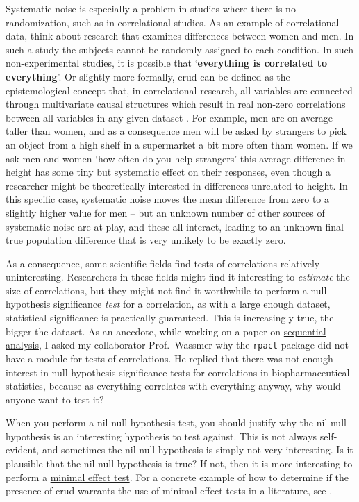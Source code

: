 \documentclass[
  oneside]{krantz}
\begin{document}
Systematic noise is especially a problem in studies where there is no randomization, such as in correlational studies. As an example of correlational data, think about research that examines differences between women and men. In such a study the subjects cannot be randomly assigned to each condition. In such non-experimental studies, it is possible that `\textbf{everything is correlated to everything}'. Or slightly more formally, crud can be defined as the epistemological concept that, in correlational research, all variables are connected through multivariate causal structures which result in real non-zero correlations between all variables in any given dataset \citep{orben_crud_2020}. For example, men are on average taller than women, and as a consequence men will be asked by strangers to pick an object from a high shelf in a supermarket a bit more often tham women. If we ask men and women `how often do you help strangers' this average difference in height has some tiny but systematic effect on their responses, even though a researcher might be theoretically interested in differences unrelated to height. In this specific case, systematic noise moves the mean difference from zero to a slightly higher value for men -- but an unknown number of other sources of systematic noise are at play, and these all interact, leading to an unknown final true population difference that is very unlikely to be exactly zero.

As a consequence, some scientific fields find tests of correlations relatively uninteresting. Researchers in these fields might find it interesting to \emph{estimate} the size of correlations, but they might not find it worthwhile to perform a null hypothesis significance \emph{test} for a correlation, as with a large enough dataset, statistical significance is practically guaranteed. This is increasingly true, the bigger the dataset. As an anecdote, while working on a paper on \protect\hyperlink{sequential}{sequential analysis}, I asked my collaborator Prof.~Wassmer why the \texttt{rpact} package did not have a module for tests of correlations. He replied that there was not enough interest in null hypothesis significance tests for correlations in biopharmaceutical statistics, because as everything correlates with everything anyway, why would anyone want to test it?

When you perform a nil null hypothesis test, you should justify why the nil null hypothesis is an interesting hypothesis to test against. This is not always self-evident, and sometimes the nil null hypothesis is simply not very interesting. Is it plausible that the nil null hypothesis is true? If not, then it is more interesting to perform a \protect\hyperlink{MET}{minimal effect test}. For a concrete example of how to determine if the presence of crud warrants the use of minimal effect tests in a literature, see \citet{ferguson_providing_2021}.
\end{document}
